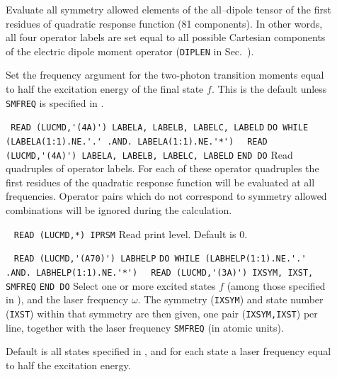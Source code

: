 \begin{description}
\item[] 
Evaluate all symmetry allowed elements of the all--dipole tensor
of the first residues of quadratic response function
(81 components). In other words, all four operator labels 
are set equal to all possible Cartesian components of 
the electric dipole moment operator (\verb+DIPLEN+ in Sec.~).
%
\item[] 
Set the frequency argument for the two-photon transition moments
equal to  half the excitation energy of the final state $f$. This is the default unless \verb+SMFREQ+ is specified in .
%
\item[] \verb| |\newline
\verb|READ (LUCMD,'(4A)') LABELA, LABELB, LABELC, LABELD|\newline
\verb|DO WHILE (LABELA(1:1).NE.'.' .AND. LABELA(1:1).NE.'*')|\newline
\verb|  READ (LUCMD,'(4A)') LABELA, LABELB, LABELC, LABELD|\newline
\verb|END DO|\newline
Read quadruples of operator labels.
For each of these operator quadruples the first residues of the quadratic response
function will be evaluated at all frequencies.
Operator pairs which do not correspond to symmetry allowed
combinations will be ignored during the calculation.
%
\item[] \verb| |\newline
\verb|READ (LUCMD,*) IPRSM|\newline
Read print level. Default is 0.
%
\item[] \verb| | \newline
\verb|READ (LUCMD,'(A70)') LABHELP|\newline
\verb|DO WHILE (LABHELP(1:1).NE.'.' .AND. LABHELP(1:1).NE.'*')|\newline
\verb|  READ (LUCMD,'(3A)') IXSYM, IXST, SMFREQ|\newline
\verb|END DO| \newline
Select one or more excited states $f$ (among those specified
in ), and the laser frequency $\omega$.
The symmetry (\verb+IXSYM+) and state number (\verb+IXST+)
within that symmetry are then given,
one pair (\verb|IXSYM,IXST|) per line, together with the
laser frequency \verb+SMFREQ+ (in atomic units).

Default is all states specified in , and for each state 
a laser frequency equal to half the excitation energy.

%
\end{description}
